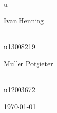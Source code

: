\documentclass[a4paper,12pt]{report}
\begin{document}
\begin{titlepage}
\begin{center}
\begin{minipage}{0.4\textwidth}
\end{minipage}
\begin{minipage}{0.4\textwidth}
\begin{flushright} \large
\emph{} \\
u
\end{flushright}
\end{minipage}
\begin{minipage}{0.4\textwidth}
\begin{flushleft} \large
Ivan {Henning}
\end{flushleft}
\end{minipage}
\begin{minipage}{0.4\textwidth}
\begin{flushright} \large
\emph{} \\
u13008219
\end{flushright}
\end{minipage}
\begin{minipage}{0.4\textwidth}
\begin{flushleft} \large
Muller {Potgieter}
\end{flushleft}
\end{minipage}
\begin{minipage}{0.4\textwidth}
\begin{flushright} \large
\emph{} \\
u12003672
\end{flushright}
\end{minipage}
\vfill
{\large \today}
\end{center}
\end{titlepage}
\footnotesize

\normalsize
\end{document}
